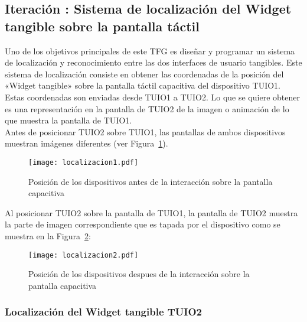 \subsection{Iteración : Sistema de localización del Widget tangible sobre la pantalla táctil}
Uno de los objetivos principales de este TFG es diseñar y programar un sistema de localización y reconocimiento entre las dos interfaces de usuario tangibles. Este sistema de localización consiste en obtener las coordenadas de la posición del «Widget tangible» sobre la pantalla táctil capacitiva del dispositivo TUIO1. Estas coordenadas son enviadas desde TUIO1 a TUIO2. Lo que se quiere obtener es una representación en la pantalla de TUIO2 de la imagen o animación de lo que muestra la pantalla de TUIO1.\\
Antes de posicionar TUIO2 sobre TUIO1, las pantallas de ambos dispositivos muestran imágenes diferentes (ver Figura~\ref{fig:Localizacion1}).
\begin{figure}[!h]
\begin{center}
\texttt{[image: localizacion1.pdf]}
\caption{Posición de los dispositivos antes de la interacción sobre la pantalla capacitiva}
\label{fig:Localizacion1}
\end{center}
\end{figure}
Al posicionar TUIO2 sobre la pantalla de TUIO1, la pantalla de TUIO2 muestra la parte de imagen correspondiente que es tapada por el dispositivo como se muestra en la Figura~\ref{fig:Localizacion2}:
\begin{figure}[!h]
\begin{center}
\texttt{[image: localizacion2.pdf]}
\caption{Posición de los dispositivos despues de la interacción sobre la pantalla capacitiva}
\label{fig:Localizacion2}
\end{center}
\end{figure}


\subsubsection{Localización del Widget tangible TUIO2}

